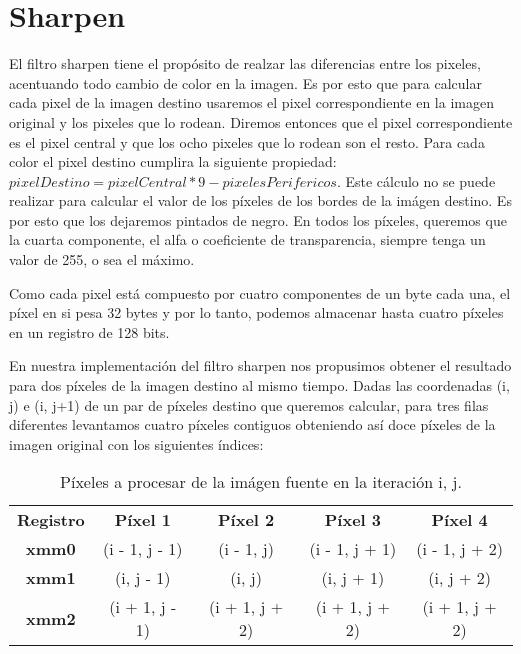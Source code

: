 \section{Sharpen}
El filtro sharpen tiene el propósito de realzar las diferencias entre los pixeles, acentuando todo cambio de color en la imagen. Es por esto que para calcular cada pixel de la imagen destino usaremos el pixel correspondiente en la imagen original y los pixeles que lo rodean. Diremos entonces que el pixel correspondiente es el pixel central y que los ocho pixeles que lo rodean son el resto. Para cada color el pixel destino cumplira la siguiente propiedad: $pixelDestino = pixelCentral * 9 - pixelesPerifericos$.
Este cálculo no se puede realizar para calcular el valor de los píxeles de los bordes de la imágen destino. Es por esto que los dejaremos pintados de negro.
En todos los píxeles, queremos que la cuarta componente, el alfa o coeficiente de transparencia, siempre tenga un valor de 255, o sea el máximo.

Como cada pixel está compuesto por cuatro componentes de un byte cada una, el píxel en si pesa 32 bytes y por lo tanto, podemos almacenar hasta cuatro píxeles en un registro de 128 bits.

En nuestra implementación del filtro sharpen nos propusimos obtener el resultado para dos píxeles de la imagen destino al mismo tiempo.
Dadas las coordenadas (i, j) e (i, j+1) de un par de  píxeles destino que queremos calcular, para tres filas diferentes levantamos cuatro píxeles contiguos obteniendo así doce píxeles de la imagen original con los siguientes índices: 

\begin{table}[h!]
  \begin{center}
    \caption{Píxeles a procesar de la imágen fuente en la iteración i, j.}
    \label{tab:table1}
    \begin{tabular}{S|S|S|S|S}
      \textbf{Registro} & \textbf{Píxel 1} & \textbf{Píxel 2} & \textbf{Píxel 3} & \textbf{Píxel 4}\\
	\textbf{xmm0} & (i - 1, j - 1) & (i - 1, j) & (i - 1, j + 1) & (i - 1, j + 2)\\
	\textbf{xmm1} & (i, j - 1) & (i, j) & (i, j + 1) & (i, j + 2)\\
	\textbf{xmm2} & (i + 1, j - 1) & (i + 1, j + 2) & (i + 1, j + 2) & (i + 1, j + 2)\\
    \end{tabular}
  \end{center}
\end{table}

